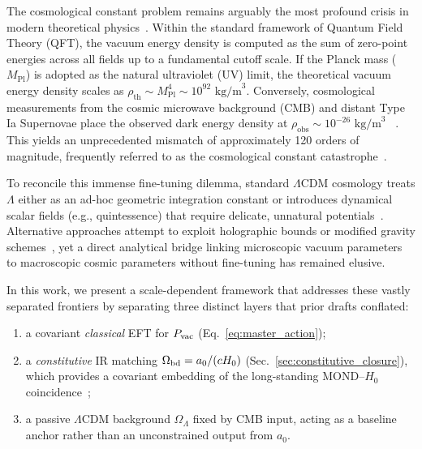 \documentclass[prd,
               reprint,
               aps,
               preprintnumbers,
               nofootinbib,
               longbibliography,
               floatfix]{revtex4-2}
\begin{document}
\maketitle


The cosmological constant problem remains arguably the most profound
crisis in modern theoretical physics~\cite{Weinberg1989,
Polchinski2006,Martin2012}. Within the standard framework 
of Quantum Field Theory (QFT), the vacuum energy density is 
computed as the sum of zero-point energies across all fields 
up to a fundamental cutoff scale. If the Planck mass 
($M_{\text{Pl}}$) is adopted as the natural ultraviolet (UV) 
limit, the theoretical vacuum energy density scales as
$\rho_{\text{th}} \sim M_{\text{Pl}}^4 \sim 10^{92}\text{ 
kg/m}^3$. Conversely, cosmological measurements from the 
cosmic microwave background (CMB) and distant Type Ia 
Supernovae place the observed dark energy density at 
$\rho_{\text{obs}} \sim 10^{-26}\text{ kg/m}^3$
~\cite{Planck2020,Riess1998,Perlmutter1999}. This yields an
unprecedented mismatch of approximately 120 orders of 
magnitude, frequently referred to as the cosmological constant
catastrophe~\cite{Carroll2001}.

To reconcile this immense fine-tuning dilemma, standard 
$\Lambda$CDM cosmology treats $\Lambda$ either as an ad-hoc 
geometric integration constant or introduces dynamical scalar 
fields (e.g., quintessence) that require delicate, 
unnatural potentials~\cite{Zlatev1999,Peebles1988,
Wetterich1988,Caldwell1998}. Alternative approaches
attempt to exploit holographic bounds or modified gravity
schemes~\cite{Padmanabhan2003,tHooft1993,Susskind1995,
Bousso2002,Cohen1999,Li2004,Clifton2012,Sotiriou2010,
DGP2000}, yet a direct analytical bridge linking microscopic 
vacuum parameters to macroscopic cosmic parameters without 
fine-tuning has remained elusive.

In this work, we present a scale-dependent framework that 
addresses these vastly separated frontiers by separating three 
distinct layers that prior drafts conflated:
\begin{enumerate}
\item a covariant \emph{classical} EFT for $P_{\rm vac}$
(Eq.~\eqref{eq:master_action});
\item a \emph{constitutive} IR matching $\Omega_{\rm bd}=
a_0/(cH_0)$ (Sec.~\ref{sec:constitutive_closure}), which 
provides a covariant embedding of the long-standing MOND--$H_0$ 
coincidence~\cite{Milgrom1983,Famaey2012};
\item a passive $\Lambda$CDM background $\Omega_\Lambda$ 
fixed by CMB input, acting as a baseline anchor rather than 
an unconstrained output from $a_0$.
\end{enumerate}
\end{document}
